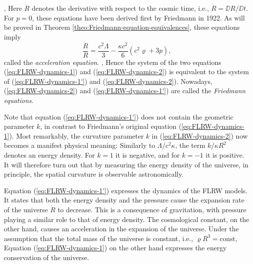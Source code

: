 \cite[154]{Sexl-Urbantke-1987}, \cite[234]{Stephani-1991}
Here $\dot{R}$ denotes the derivative with respect to the cosmic time, i.e., $\dot{R} = \DD R/\DD t$.
For $p=0$, these equations have been derived first by Friedmann in 1922. \cite[(4) \& (5)]{Friedmann-1922}
As will be proved in Theorem \ref{theo:Friedmann-equation-equivalences}, these equations imply
\begin{equation}
	\frac{\ddot{R}}{R}
	= \frac{c^2\Lambda}{3}
	- \frac{\kappa c^2}{6} \left( c^2 \varrho + 3p \right)
	,
	\label{eq:FLRW-dynamics-1'}
\end{equation}
called the \emph{acceleration equation}. \cite[60]{Ryden-2017}, \cite[485]{Unsoeld-Baschek-1999}
Hence the system of the two equations (\ref{eq:FLRW-dynamics-1}) and (\ref{eq:FLRW-dynamics-2}) is equivalent to the system of (\ref{eq:FLRW-dynamics-1'}) and (\ref{eq:FLRW-dynamics-2}). Nowadays, (\ref{eq:FLRW-dynamics-2}) and (\ref{eq:FLRW-dynamics-1'}) are called the \emph{Friedmann equations}.

\begin{bem}
	\label{bem:FLRW-physical-meaning-of-geometric-parameter-k}
	Note that equation (\ref{eq:FLRW-dynamics-1'}) does not contain the geometric parameter $k$, in contrast to Friedmann's original equation (\ref{eq:FLRW-dynamics-1}).
	Most remarkably, the curvature parameter $k$ in (\ref{eq:FLRW-dynamics-2}) now becomes a manifest physical meaning: Similarly to $\Lambda/c^2 \kappa$,  the term $k / \kappa R^2$ denotes an energy density. For $k=1$ it is negative, and for $k=-1$ it is positive. \cite[155]{Sexl-Urbantke-1987}
	It will therefore turn out that by measuring the energy density of the universe, in principle, the spatial curvature is observable astronomically.
\end{bem}

Equation (\ref{eq:FLRW-dynamics-1'}) expresses the dynamics of the FLRW models. It states that both the energy density and the pressure cause the expansion rate of the universe $\dot{R}$ to decrease. This is a consequence of gravitation, with pressure playing a similar role to that of energy density. The cosmological constant, on the other hand, causes an acceleration in the expansion of the universe.
Under the assumption that the total mass of the universe is constant, i.e., $\varrho R^3 = \mathrm{const}$, Equation (\ref{eq:FLRW-dynamics-1}) on the other hand expresses the energy conservation of the universe. \cite[155]{Sexl-Urbantke-1987}

